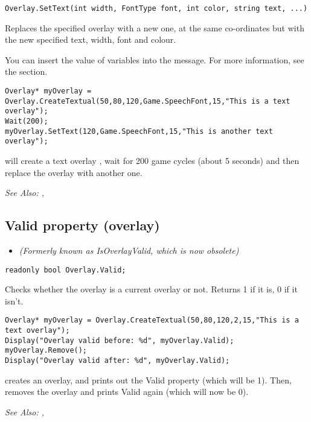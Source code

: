 \begin{verbatim}
Overlay.SetText(int width, FontType font, int color, string text, ...)
\end{verbatim}
Replaces the specified overlay with a new one, at the same co-ordinates but with
the new specified text, width, font and colour.

You can insert the value of variables into the message. For more information,
see the  section.

\begin{verbatim}
Overlay* myOverlay = Overlay.CreateTextual(50,80,120,Game.SpeechFont,15,"This is a text overlay");
Wait(200);
myOverlay.SetText(120,Game.SpeechFont,15,"This is another text overlay");
\end{verbatim}
will create a text overlay , wait for 200 game cycles (about 5 seconds) and then
replace the overlay with another one.

\it{See Also:} ,


\subsection{Valid property (overlay)}\label{Overlay.Valid}%

\begin{itemize}
\item \it{(Formerly known as IsOverlayValid, which is now obsolete)}
\end{itemize}

\begin{verbatim}
readonly bool Overlay.Valid;
\end{verbatim}
Checks whether the overlay is a current overlay or not.
Returns 1 if it is, 0 if it isn't.

\begin{verbatim}
Overlay* myOverlay = Overlay.CreateTextual(50,80,120,2,15,"This is a text overlay");
Display("Overlay valid before: %d", myOverlay.Valid);
myOverlay.Remove();
Display("Overlay valid after: %d", myOverlay.Valid);
\end{verbatim}
creates an overlay, and prints out the Valid property (which will be 1). Then, removes
the overlay and prints Valid again (which will now be 0).

\it{See Also:} ,



